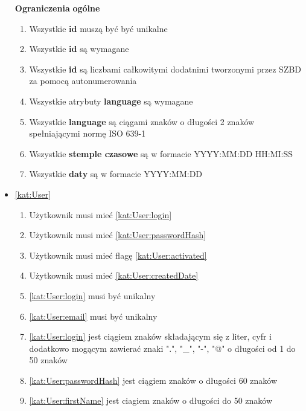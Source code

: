 \begin{itemize}[label={\textbf{Ograniczenia dla}}, wide, labelwidth=!, labelindent=0pt]
    \setlength\itemsep{1em}
    \item[\textbf{Ograniczenia}] \textbf{ogólne}
    \begin{enumerate}[label={\textbf{OGR/\protect\threedigits{\arabic{enumi}}}}, wide, labelwidth=!, align=left, leftmargin=3cm]
        \item Wszystkie \textbf{id} muszą być być unikalne
        \item Wszystkie \textbf{id} są wymagane
        \item Wszystkie \textbf{id} są liczbami całkowitymi dodatnimi tworzonymi przez SZBD za pomocą autonumerowania
        \item Wszystkie atrybuty \textbf{language} są wymagane
        \item Wszystkie \textbf{language} są ciągami znaków o długości 2 znaków spełniającymi normę ISO 639-1
        \item Wszystkie \textbf{stemple czasowe} są w formacie YYYY:MM:DD HH:MI:SS
        \item Wszystkie \textbf{daty} są w formacie YYYY:MM:DD
    \end{enumerate}
    \item\ref{kat:User}
    \begin{enumerate}[label={\textbf{OGR/\protect\threedigits{\arabic{enumi}}}}, wide, labelwidth=!, align=left, leftmargin=3cm]
        \item Użytkownik musi mieć \ref{kat:User:login}
        \item Użytkownik musi mieć \ref{kat:User:passwordHash}
        \item Użytkownik musi mieć flagę \ref{kat:User:activated}
        \item Użytkownik musi mieć \ref{kat:User:createdDate}
        \item \ref{kat:User:login} musi być unikalny
        \item \ref{kat:User:email} musi być unikalny
        \item \ref{kat:User:login} jest ciągiem znaków składającym się z liter, cyfr i dodatkowo mogącym zawierać znaki ".", "\_", "-", "@" o długości od 1 do 50 znaków
        \item \ref{kat:User:passwordHash} jest ciągiem znaków o długości 60 znaków
        \item \ref{kat:User:firstName} jest ciagiem znaków o długości do 50 znaków

\end{enumerate}
\end{itemize}
